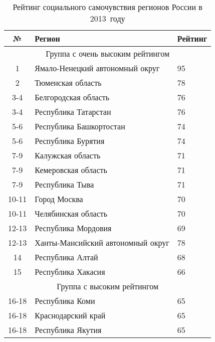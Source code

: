  \begin{table}[p]
    \footnotesize
    \caption{Рейтинг социального самочувствия регионов России в 2013~году}
    \label{tab:1}
    \hspace{-2em}
    \begin{tabular}{|c|l|l|} \hline
      №     & Регион                            & Рейтинг    \\ \hline
      \multicolumn{3}{|c|}{Группа с очень высоким рейтингом} \\ \hline
      1     & Ямало-Ненецкий автономный округ   & 95         \\ \hline
      2     & Тюменская область                 & 78         \\ \hline
      3-4   & Белгородская область              & 76         \\ \hline
      3-4   & Республика Татарстан              & 76         \\ \hline
      5-6   & Республика Башкортостан           & 74         \\ \hline
      5-6   & Республика Бурятия                & 74         \\ \hline
      7-9   & Калужская область                 & 71         \\ \hline
      7-9   & Кемеровская область               & 71         \\ \hline
      7-9   & Республика Тыва                   & 71         \\ \hline
      10-11 & Город Москва                      & 70         \\ \hline
      10-11 & Челябинская область               & 70         \\ \hline
      12-13 & Республика Мордовия               & 69         \\ \hline
      12-13 & Ханты-Мансийский автономный округ & 78         \\ \hline
      14    & Республика Алтай                  & 68         \\ \hline
      15    & Республика Хакасия                & 66         \\ \hline
      \multicolumn{3}{|c|}{Группа с высоким рейтингом}       \\ \hline
      16-18 & Республика Коми                   & 65         \\ \hline
      16-18 & Краснодарский край                & 65         \\ \hline
      16-18 & Республика Якутия                 & 65         \\ \hline

\end{tabular}
\end{table}
